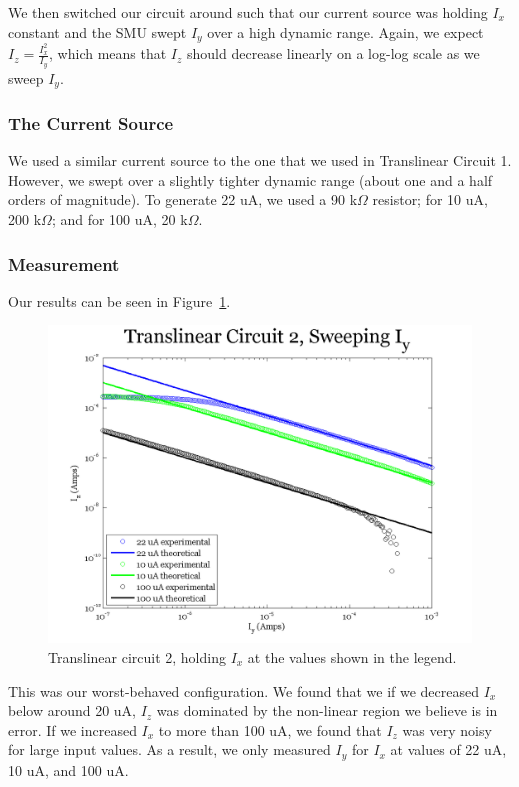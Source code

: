 \documentclass{article}
\begin{document}
We then switched our circuit around such that our current source was holding $I_x$ constant and the SMU swept $I_y$ over a high dynamic range.  Again, we expect $I_z = \frac{I_x^2}{I_y}$, which means that $I_z$ should decrease linearly on a log-log scale as we sweep $I_y$.  

\subsubsection*{The Current Source}

We used a similar current source to the one that we used in Translinear Circuit 1.  However, we swept over a slightly tighter dynamic range (about one and a half orders of magnitude).  To generate 22 uA, we used a 90 k$\Omega$ resistor; for 10 uA, 200 k$\Omega$; and for 100 uA, 20 k$\Omega$.

\subsubsection*{Measurement}

Our results can be seen in Figure~\ref{fig:tl2sweepy}.

\begin{figure}[H]
\begin{center}
\includegraphics[scale=.75]{exp3_sweepy.png}
\caption{Translinear circuit 2, holding $I_x$ at the values shown in the legend.}
\label{fig:tl2sweepy}
\end{center}
\end{figure}

This was our worst-behaved configuration.  We found that we if we decreased $I_x$ below around 20 uA, $I_z$ was dominated by the non-linear region we believe is in error.  If we increased $I_x$ to more than 100 uA, we found that $I_z$ was very noisy for large input values.  As a result, we only measured $I_y$ for $I_x$ at values of 22 uA, 10 uA, and 100 uA.
\end{document}
